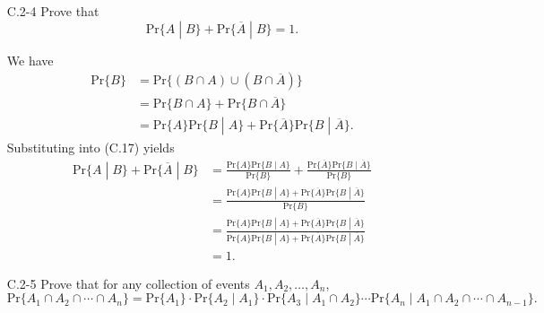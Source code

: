 \documentclass{report}
\makeatletter
\renewenvironment{framed}{%
 \def\FrameCommand##1{\hskip\@totalleftmargin
 \fboxsep=\FrameSep\fbox{##1}}%
 \MakeFramed {\advance\hsize-\width
   \@totalleftmargin\z@ \linewidth\hsize
   \@setminipage}}%
 {\par\unskip\endMakeFramed}
\makeatother
\begin{document}
\begin{enumerate}
\item[C.2{-}4] {Prove that
\[
  \text{Pr}\{A\;|\;B\} + \text{Pr}\{\overline{A}\;|\;B\} = 1.
\]
}

\begin{framed}
We have
\begin{equation*}
\begin{aligned}
  \text{Pr}\{B\} &= \text{Pr}\{(B \cap A) \cup (B \cap \overline{A})\}\\
                 &= \text{Pr}\{B \cap A\} + \text{Pr}\{B \cap \overline{A}\}\\
                 &= \text{Pr}\{A\} \text{Pr}\{B\;|\;A\} + \text{Pr}\{\overline{A}\} \text{Pr}\{B\;|\;\overline{A}\}.
\end{aligned}
\end{equation*}
Substituting into (C.17) yields
\begin{equation*}
\begin{aligned}
  \text{Pr}\{A\;|\;B\} + \text{Pr}\{\overline{A}\;|\;B\}
  &= \frac{\text{Pr}\{A\} \text{Pr}\{B\;|\;A\}}{\text{Pr}\{B\}} +
     \frac{\text{Pr}\{\overline{A}\} \text{Pr}\{B\;|\;\overline{A}\}}{\text{Pr}\{B\}}\\
  &= \frac{\text{Pr}\{A\} \text{Pr}\{B\;|\;A\} + \text{Pr}\{\overline{A}\} \text{Pr}\{B\;|\;\overline{A}\}}
          {\text{Pr}\{B\}}\\
  &= \frac{\text{Pr}\{A\} \text{Pr}\{B\;|\;A\} + \text{Pr}\{\overline{A}\} \text{Pr}\{B\;|\;\overline{A}\}}
          {\text{Pr}\{A\} \text{Pr}\{B\;|\;A\} + \text{Pr}\{\overline{A}\} \text{Pr}\{B\;|\;\overline{A}\}}\\
  &= 1.
\end{aligned}
\end{equation*}

\end{framed}

\item[C.2{-}5] {Prove that for any collection of events $A_1, A_2, \dots, A_n$,
\[
  \text{Pr}\{A_1 \cap A_2 \cap \cdots \cap A_n\} =
    \text{Pr}\{A_1\} \cdot \text{Pr}\{A_2\;|\;A_1\} \cdot \text{Pr}\{A_3\;|\;A_1 \cap A_2\} \cdots
    \text{Pr}\{A_n\;|\;A_1 \cap A_2 \cap \cdots \cap A_{n - 1}\}.
\]
}


\end{enumerate}
\end{document}
